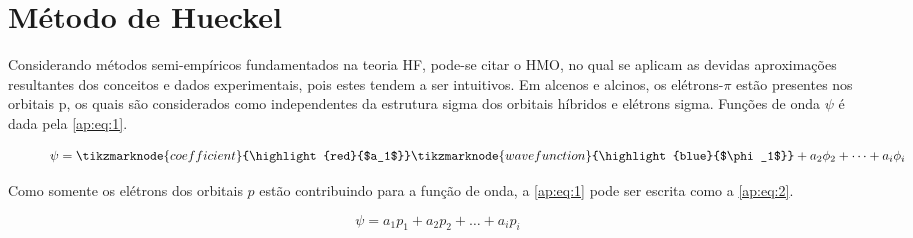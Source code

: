 \chapter{Método de Hueckel} \label{ap:HMO}

Considerando métodos semi-empíricos fundamentados na teoria \gls{HF}, pode-se citar o \gls{HMO}, no qual se aplicam as devidas aproximações resultantes dos conceitos e dados experimentais, pois estes tendem a ser intuitivos. Em alcenos e alcinos, os elétrons-$\pi$ estão presentes nos orbitais p, os quais são considerados como independentes da estrutura sigma dos orbitais híbridos e elétrons sigma. Funções de onda $\psi$ é dada pela \autoref{ap:eq:1}.

\begin{figure}[htb]
    \vspace{2\baselineskip}
\begin{equation}
    \label{ap:eq:1}
    \psi = \tikzmarknode{coefficient}{\highlight{red}{$a_1$}} \tikzmarknode{wavefunction}{\highlight{blue}{$\phi_1$}} + a_2\phi_2 + \dots + a_i \phi_i
\end{equation}
\end{figure}

Como somente os elétrons dos orbitais $p$ estão contribuindo para a função de onda, a \autoref{ap:eq:1} pode ser escrita como a \autoref{ap:eq:2}.

\begin{figure}[htb]
    \vspace{2\baselineskip}
\begin{equation}
    \label{ap:eq:2}
    \psi = a_1 p_1 + a_2 p_2 + \dots + a_i p_i
\end{equation}
\end{figure}

